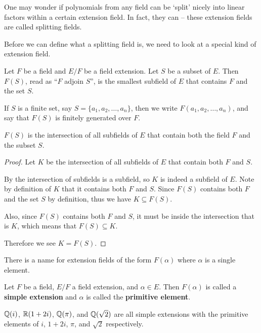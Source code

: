 One may wonder if polynomials from any field can be `split' nicely into linear factors within a certain extension field. In fact, they can -- these extension fields are called splitting fields.

Before we can define what a splitting field is, we need to look at a special kind of extension field.

\begin{definition}
    Let $F$ be a field and $E/F$ be a field extension. Let $S$ be a subset of $E$. Then $F(S)$, read as ``$F$ adjoin $S$'', is the smallest subfield of $E$ that contains $F$ and the set $S$.

    If $S$ is a finite set, say $S = \{a_1, a_2, \dots, a_n\}$, then we write $F(a_1, a_2, \dots, a_n)$, and say that $F(S)$ is finitely generated over $F$.
\end{definition}

\begin{proposition}
    $F(S)$ is the intersection of all subfields of $E$ that contain both the field $F$ and the subset $S$.
\end{proposition}
\begin{proof}
    Let $K$ be the intersection of all subfields of $E$ that contain both $F$ and $S$.

    By  the intersection of subfields is a subfield, so $K$ is indeed a subfield of $E$. Note by definition of $K$ that it contains both $F$ and $S$. Since $F(S)$ contains both $F$ and the set $S$ by definition, thus we have $K \subseteq F(S)$.

    Also, since $F(S)$ contains both $F$ and $S$, it must be inside the intersection that is $K$, which means that $F(S) \subseteq K$.

    Therefore we see $K = F(S)$.
\end{proof}

There is a name for extension fields of the form $F(\alpha)$ where $\alpha$ is a single element.

\begin{definition}
    Let $F$ be a field, $E/F$ a field extension, and $\alpha \in E$. Then $F(\alpha)$ is called a \textbf{simple extension} and $\alpha$ is called the \textbf{primitive element}.
\end{definition}

\begin{example}
    $\mathbb{Q}(i)$, $\mathbb{R}(1+2i)$, $\mathbb{Q}(\pi)$, and $\mathbb{Q}(\sqrt 2)$ are all simple extensions with the primitive elements of $i$, $1+2i$, $\pi$, and $\sqrt 2$ respectively.
\end{example}

